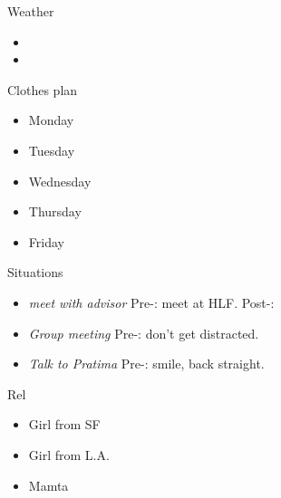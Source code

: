 \documentclass[serif, mathserif, final]{beamer}
\begin{document}
\begin{frame}
\begin{columns}
\begin{column}{0.20\linewidth}
      \begin{block}{Weather} 
        \begin{itemize}
          \tiny \item \tiny 
        \item \tiny 
        \end{itemize}
      \end{block} 

      \begin{block}{Clothes plan} 
        \begin{itemize}
          \tiny \item \tiny Monday
        \item \tiny Tuesday
        \item \tiny Wednesday
        \item \tiny Thursday
        \item \tiny Friday
        \end{itemize} 
      \end{block}
      
      \begin{block}{Situations}

        \begin{itemize} 
          
          \tiny \item \tiny \textit{meet with advisor} Pre-: meet at
          HLF. Post-: 
  
        \item \tiny \textit{Group meeting} Pre-: don't get
          distracted. 


        \item \tiny \textit{Talk to Pratima} Pre-: smile, back straight. 

        \end{itemize} 

      \end{block}
      
\begin{block}{Rel}
  \begin{itemize} 
    \small \item \small Girl from SF 
    \small \item \small Girl from L.A. 
    \small \item \small Mamta 

  \end{itemize} 
\end{block} 
\end{column}%

\end{columns}

\end{frame}
\end{document}

